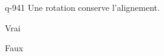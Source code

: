 \begin{truefalse}{q-941}
Une rotation conserve l'alignement.
\item* Vrai
\item Faux
\end{truefalse}

